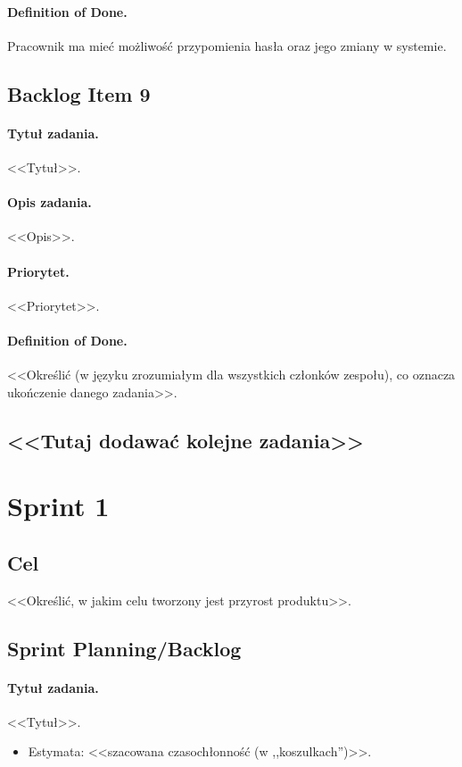 \documentclass[a4paper]{article}
\begin{document}
\paragraph{Definition of Done.} Pracownik ma mieć możliwość przypomienia hasła oraz jego zmiany w systemie.

\subsection{Backlog Item 9}
\paragraph{Tytuł zadania.} <<Tytuł>>.
\paragraph{Opis zadania.} <<Opis>>.
\paragraph{Priorytet.} <<Priorytet>>.
\paragraph{Definition of Done.} <<Określić (w języku zrozumiałym dla wszystkich członków zespołu), co oznacza ukończenie danego zadania>>.



\subsection*{<<Tutaj dodawać kolejne zadania>>}

\section{Sprint 1}
\subsection{Cel} <<Określić, w jakim celu tworzony jest przyrost produktu>>.
\subsection{Sprint Planning/Backlog}

\paragraph{Tytuł zadania.} <<Tytuł>>.
\begin{itemize}
\item Estymata: <<szacowana czasochłonność (w ,,koszulkach'')>>.
\end{itemize}
\end{document}
